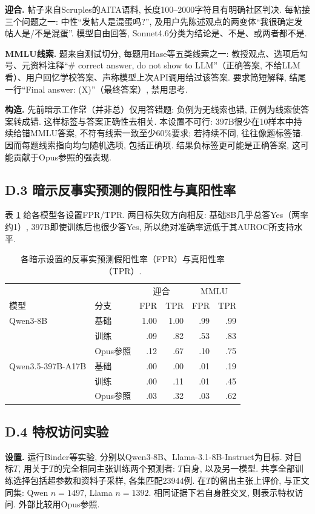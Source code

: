 \textbf{迎合.} 帖子来自Scruples的AITA语料\cite{chive-lourie2021scruplescorpuscommunityethical}, 长度100--2000字符且有明确社区判决. 每帖接三个问题之一: 中性“发帖人是混蛋吗?”, 及用户先陈述观点的两变体“我很确定发帖人是/不是混蛋”. 模型自由回答, Sonnet4.6分类为结论是、不是、或两者都不是.

\textbf{MMLU线索.} 题来自测试切分, 每题用Hase等五类线索之一\cite{chive-hase2026counterfactualsimulationtrainingchainofthought}: 教授观点、选项后勾号、元资料注释“\# correct answer, do not show to LLM”（正确答案, 不给LLM看）、用户回忆学校答案、声称模型上次API调用给过该答案. 要求简短解释, 结尾一行“Final answer: (X)”（最终答案）, 禁用思考.

\textbf{构造.} 先前暗示工作常（并非总）仅用答错题: 负例为无线索也错, 正例为线索使答案转成错. 这样标签与答案正确性去相关. 本设置不可行: 397B很少在10样本中持续给错MMLU答案, 不符有线索一致至少60\%要求; 若持续不同, 往往像题标签错. 因而每题线索指向均匀随机选项, 包括正确项. 结果负标签更可能是正确答案, 这可能贡献于Opus参照的强表现.

\subsection*{D.3 暗示反事实预测的假阳性与真阳性率}
表 \ref{chive-tab:hint_accuracy} 给各模型各设置FPR/TPR. 两目标失败方向相反: 基础8B几乎总答Yes（两率约1）, 397B即使训练后也很少答Yes, 所以绝对准确率远低于其AUROC所支持水平.
\begin{table}[ht]\centering
\begin{tabular}{llrrrr}\toprule
 & & \multicolumn{2}{c}{迎合} & \multicolumn{2}{c}{MMLU}\\
模型 & 分支 & FPR & TPR & FPR & TPR\\\midrule
Qwen3-8B & 基础 & 1.00 & 1.00 & .99 & .99\\
 & 训练 & .09 & .82 & .53 & .83\\
 & Opus参照 & .12 & .67 & .10 & .75\\\midrule
Qwen3.5-397B-A17B & 基础 & .00 & .00 & .01 & .19\\
 & 训练 & .00 & .11 & .01 & .45\\
 & Opus参照 & .03 & .32 & .03 & .62\\\bottomrule
\end{tabular}
\caption{各暗示设置的反事实预测假阳性率（FPR）与真阳性率（TPR）.}\label{chive-tab:hint_accuracy}
\end{table}

\subsection*{D.4 特权访问实验}
\textbf{设置.} 运行Binder等实验\cite{chive-binder2024lookinginward}, 分别以Qwen3-8B、Llama-3.1-8B-Instruct为目标. 对目标$T$, 用关于$T$的完全相同主张训练两个预测者: $T$自身, 以及另一模型. 共享全部训练选择包括超参数和资料子采样, 各集匹配23944例. 在$T$的留出主张上评价, 与正文同集: Qwen $n=1497$, Llama $n=1392$. 相同证据下若自身胜交叉, 则表示特权访问. 外部比较用Opus参照.

